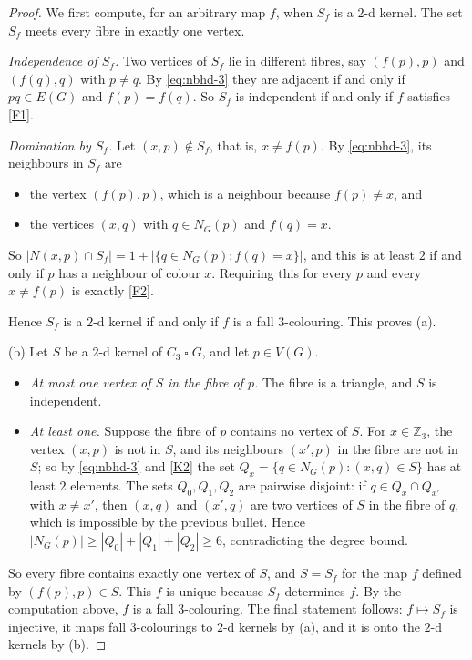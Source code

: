 \documentclass[11pt]{article}
\theoremstyle{plain}
\theoremstyle{definition}
\theoremstyle{remark}
\newcommand{\Z}{\mathbb{Z}}
\newcommand{\T}{\mathbin{\square}}
\begin{document}
\begin{proof}
We first compute, for an arbitrary map $f$, when $S_f$ is a $2$-d kernel. The set $S_f$ meets
every fibre in exactly one vertex.

\emph{Independence of $S_f$.} Two vertices of $S_f$ lie in different fibres, say
$(f(p), p)$ and $(f(q), q)$ with $p \ne q$. By \eqref{eq:nbhd-3} they are adjacent if and
only if $pq \in E(G)$ and $f(p) = f(q)$. So $S_f$ is independent if and only if $f$
satisfies \ref{F1}.

\emph{Domination by $S_f$.} Let $(x, p) \notin S_f$, that is, $x \ne f(p)$. By
\eqref{eq:nbhd-3}, its neighbours in $S_f$ are
\begin{itemize}
  \item the vertex $(f(p), p)$, which is a neighbour because $f(p) \ne x$, and
  \item the vertices $(x, q)$ with $q \in N_G(p)$ and $f(q) = x$.
\end{itemize}
So $|N(x,p) \cap S_f| = 1 + |\{q \in N_G(p) : f(q) = x\}|$, and this is at least $2$ if and
only if $p$ has a neighbour of colour $x$. Requiring this for every $p$ and every
$x \ne f(p)$ is exactly \ref{F2}.

Hence $S_f$ is a $2$-d kernel if and only if $f$ is a fall $3$-colouring. This proves (a).

(b) Let $S$ be a $2$-d kernel of $C_3 \T G$, and let $p \in V(G)$.
\begin{itemize}
  \item \emph{At most one vertex of $S$ in the fibre of $p$.} The fibre is a triangle, and
        $S$ is independent.
  \item \emph{At least one.} Suppose the fibre of $p$ contains no vertex of $S$. For
        $x \in \Z_3$, the vertex $(x,p)$ is not in $S$, and its neighbours $(x', p)$ in the
        fibre are not in $S$; so by \eqref{eq:nbhd-3} and \ref{K2} the set
        $Q_x = \{q \in N_G(p) : (x, q) \in S\}$ has at least $2$ elements. The sets
        $Q_0, Q_1, Q_2$ are pairwise disjoint: if $q \in Q_x \cap Q_{x'}$ with $x \ne x'$, then
        $(x,q)$ and $(x',q)$ are two vertices of $S$ in the fibre of $q$, which is impossible
        by the previous bullet. Hence
        $|N_G(p)| \ge |Q_0| + |Q_1| + |Q_2| \ge 6$, contradicting the degree bound.
\end{itemize}
So every fibre contains exactly one vertex of $S$, and $S = S_f$ for the map $f$ defined by
$(f(p), p) \in S$. This $f$ is unique because $S_f$ determines $f$. By the computation above,
$f$ is a fall $3$-colouring. The final statement follows: $f \mapsto S_f$ is injective, it maps
fall $3$-colourings to $2$-d kernels by (a), and it is onto the $2$-d kernels by (b).
\end{proof}
\end{document}
